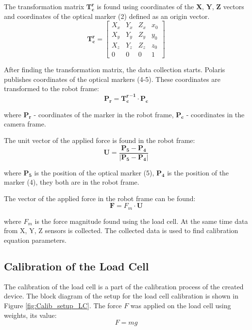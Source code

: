 	The transformation matrix $\mathbf{T_{c}^{ r}}$ is found using coordinates of the $\mathbf{X}$, $\mathbf{Y}$, $\mathbf{Z}$ vectors and coordinates of the optical marker (2) defined as an origin vector.
\begin{equation}
\mathbf{T_{c}^{ r}} = 
\begin{bmatrix}
    X_{x} 	& Y_{x} 		& Z_{x} 		&  x_{0} \\
    X_{y} 	& Y_{y} 		& Z_{y} 		&  y_{0} \\
    X_{z} 	& Y_{z} 		& Z_{z} 		&  z_{0} \\
    0		 	& 0 			& 0 			& 1
\end{bmatrix}
\end{equation}

	After finding the transformation matrix, the data collection starts. Polaris publishes coordinates of the optical markers (4-5). These coordinates are transformed to the robot frame:
\begin{equation}
\mathbf{P_{r}} = \mathbf{{T_{c}^{ r}}^{-1}} \cdot \mathbf{P_{c}}
\end{equation}

	where $\mathbf{P_{r}}$ - coordinates of the marker in the robot frame, $\mathbf{P_{c}}$ - coordinates in the camera frame.
	
	The unit vector of the applied force is found in the robot frame:
\begin{equation}
\mathbf{U} = \frac{\mathbf{P_{5}} - \mathbf{P_{4}}}{|\mathbf{P_{5}} - \mathbf{P_{4}|}}
\end{equation}
	
	where $\mathbf{P_{5}}$ is the position of the optical marker (5), $\mathbf{P_{4}}$ is the position of the marker (4), they both are in the robot frame.
	
	The vector of the applied force in the robot frame can be found:
\begin{equation}
\mathbf{F} = F_{m} \cdot \mathbf{U}
\end{equation}

	where $F_{m}$ is the force magnitude found using the load cell.
	At the same time data from X, Y, Z sensors is collected. The collected data is used to find calibration equation parameters.
	
	\subsection{Calibration of the Load Cell}
	\label{sec:CalLoadCell}
	The calibration of the load cell is a part of the calibration process of the created device. The block diagram of the setup for the load cell calibration is shown in Figure \ref{fig:Calib_setup_LC}. The force $F$ was applied on the load cell using weights, its value: 
\begin{equation}
F = mg
\end{equation}

